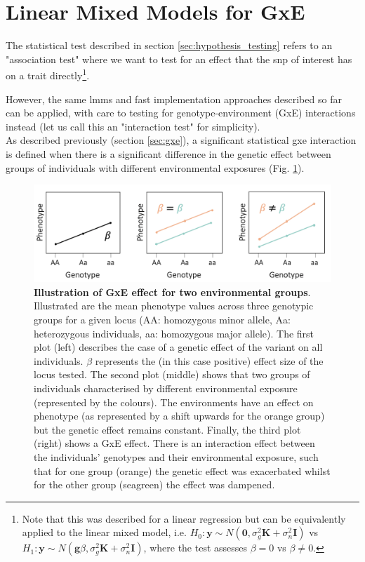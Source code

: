 \section{Linear Mixed Models for GxE}
\label{sec:lmm_gxe}

The  statistical test described in section \ref{sec:hypothesis_testing} refers to an "association test" where we want to test for an effect that the \gls{snp} of interest has on a trait directly\footnote{Note that this was described for a linear regression but can be equivalently applied to the linear mixed model, i.e. $H_0: \mathbf{y} \sim N (\mathbf{0}, \sigma_g^2\mathbf{K} + \sigma_n^2\mathbf{I})$ vs $H_1: \mathbf{y} \sim N (\mathbf{g}\beta, \sigma_g^2\mathbf{K} + \sigma_n^2\mathbf{I})$, where the test assesses $\beta = 0$ vs $\beta \neq 0$.}.

However, the same \gls{lmm}s and fast implementation approaches described so far can be applied, with care to testing for genotype-environment (GxE) interactions instead (let us call this an "interaction test" for simplicity).\\

As described previously (section \ref{sec:gxe}), a significant statistical \gls{gxe} interaction is defined when there is a significant difference in the genetic effect between groups of individuals with different environmental exposures (Fig. \ref{fig:gxe}).

\begin{figure}[h]
\centering
\includegraphics[width=15cm]{Chapter1/Fig/GxE.png}
\caption[Illustration of GxE]{\textbf{Illustration of GxE effect for two environmental groups}.\\
Illustrated are the mean phenotype values across three genotypic groups for a given locus (AA: homozygous minor allele, Aa: heterozygous individuals, aa: homozygous major allele).
The first plot (left) describes the case of a genetic effect of the variant on all individuals. 
$\beta$ represents the (in this case positive) effect size of the locus tested. 
The second plot (middle) shows that two groups of individuals characterised by different environmental exposure (represented by the colours). 
The environments have an effect on phenotype (as represented by a shift upwards for the orange group) but the genetic effect remains constant. 
Finally, the third plot (right) shows a GxE effect.
There is an interaction effect between the individuals' genotypes and their environmental exposure, such that for one group (orange) the genetic effect was exacerbated whilst for the other group (seagreen) the effect was dampened.}
\label{fig:gxe}
\end{figure}

